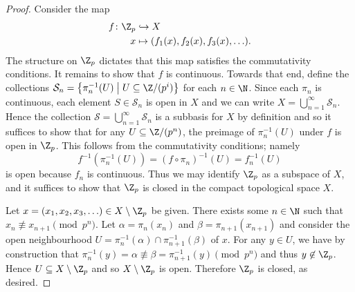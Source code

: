 \documentclass[10pt]{amsart}
\begin{document}
\begin{thm}
\begin{proof}
    Consider the map     
    \begin{align*}
      f \colon \Z_p &\hookrightarrow X\\
      x &\mapsto (f_1(x), f_2(x), f_3(x), \ldots).
    \end{align*}
    The structure on $\Z_p$ dictates that this map satisfies the commutativity conditions.
    It remains to show that $f$ is continuous.
    Towards that end, define the collections $\mathcal{S}_n = \left\{\pi_n^{-1}(U) \;\middle\vert\; U \subseteq \Z/(p^i) \right\}$ for each $n \in \N$.
    Since each $\pi_n$ is continuous, each element $S \in \mathcal{S}_n$ is open in $X$ and we can write $X = \bigcup_{n=1}^\infty \mathcal{S}_n$.
    Hence the collection $\mathcal{S} = \bigcup_{n=1}^\infty \mathcal{S}_n$ is a subbasis for $X$ by definition and so it suffices to show that for any $U \subseteq \Z/(p^n)$, the preimage of $\pi_n^{-1}(U)$ under $f$ is open in $\Z_p$.
    This follows from the commutativity conditions; namely 
    $$f^{-1}(\pi_n^{-1}(U)) = (f \circ \pi_n)^{-1}(U) = f_n^{-1}(U)$$
    is open because $f_n$ is continuous.
    Thus we may identify $\Z_p$ as a subspace of $X$, and it suffices to show that $\Z_p$ is closed in the compact topological space $X$.
    
    Let $x = (x_1, x_2, x_3, \ldots) \in X \setminus \Z_p$ be given.
    There exists some $n \in \N$ such that $x_n \not \equiv x_{n+1} \pmod{p^n}$.
    Let $\alpha = \pi_n(x_n)$ and $\beta = \pi_{n+1}(x_{n+1})$ and consider the open neighbourhood $U = \pi_n^{-1}(\alpha) \cap \pi_{n+1}^{-1}(\beta)$ of $x$.
    For any $y \in U$, we have by construction that $\pi_n^{-1}(y) = \alpha \not \equiv \beta = \pi_{n+1}^{-1}(y) \pmod{p^n}$ and thus $y \not \in \Z_p$.
    Hence $U \subseteq X \setminus \Z_p$ and so $X \setminus \Z_p$ is open.
    Therefore $\Z_p$ is closed, as desired.
    
  \end{proof}
\end{thm}
\end{document}
